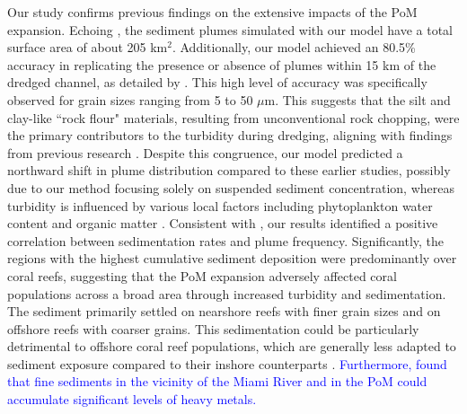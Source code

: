 \documentclass[preprint,12pt,authoryear]{elsarticle}
\newcommand{\modif}[1]{\textcolor{blue}{#1}}
\begin{document}
Our study confirms previous findings on the extensive impacts of the PoM expansion. Echoing \cite{barnes2015sediment}, the sediment plumes simulated with our model have a total surface area of about 205 km$^2$. Additionally, our model achieved an 80.5\% accuracy in replicating the presence or absence of plumes within 15 km of the dredged channel, as detailed by \cite{cunning2019extensive}. This high level of accuracy was specifically observed for grain sizes ranging from 5 to 50 $\mu$m. This suggests that the silt and clay-like ``rock flour" materials, resulting from unconventional rock chopping, were the primary contributors to the turbidity during dredging, aligning with findings from previous research \citep{storlazzi2015influence,fourney2017additive}. Despite this congruence, our model predicted a northward shift in plume distribution compared to these earlier studies, possibly due to our method focusing solely on suspended sediment concentration, whereas turbidity is influenced by various local factors including phytoplankton water content and organic matter \citep{gray2000comparability,thackston2000improved}. Consistent with \cite{cunning2019extensive}, our results identified a positive correlation between sedimentation rates and plume frequency. Significantly, the regions with the highest cumulative sediment deposition were predominantly over coral reefs, suggesting that the PoM expansion adversely affected coral populations across a broad area through increased turbidity and sedimentation. The sediment primarily settled on nearshore reefs with finer grain sizes and on offshore reefs with coarser grains. This sedimentation could be particularly detrimental to offshore coral reef populations, which are generally less adapted to sediment exposure compared to their inshore counterparts \citep{wolanski2005fine}. \modif{Furthermore, \citep{long2002chemical} found that fine sediments in the vicinity of the Miami River and in the PoM could accumulate significant levels of heavy metals.}
\end{document}
